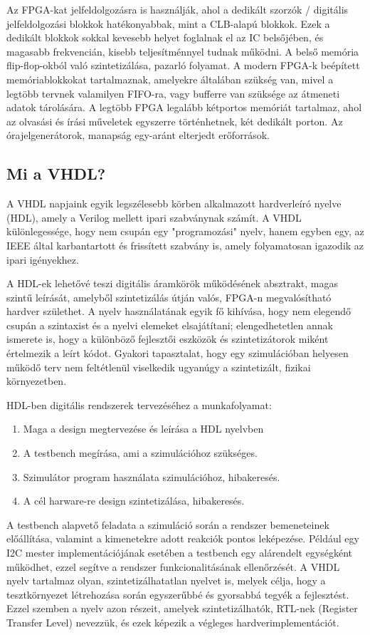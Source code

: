 \documentclass[a4paper,12pt,oneside]{book}
\begin{document}
Az FPGA-kat jelfeldolgozásra is használják, ahol a dedikált szorzók / digitális jelfeldolgozási blokkok hatékonyabbak, mint a CLB-alapú blokkok. Ezek a dedikált blokkok sokkal kevesebb helyet foglalnak el az IC belsőjében, és magasabb frekvencián, kisebb teljesítménnyel tudnak működni. A belső memória flip-flop-okból való szintetizálása, pazarló folyamat. A modern FPGA-k beépített memóriablokkokat tartalmaznak, amelyekre általában szükség van, mivel a legtöbb tervnek valamilyen FIFO-ra, vagy bufferre van szüksége az átmeneti adatok tárolására. A legtöbb FPGA legalább kétportos memóriát tartalmaz, ahol az olvasási és írási műveletek egyszerre történhetnek, két dedikált porton. Az órajelgenerátorok, manapság egy-aránt elterjedt erőforrások.
\fi
\subsection{Mi a VHDL?}

A VHDL napjaink egyik legszélesebb körben alkalmazott hardverleíró nyelve (HDL), amely a Verilog mellett ipari szabványnak számít. A VHDL különlegessége, hogy nem csupán egy "programozási" nyelv, hanem egyben egy, az IEEE által karbantartott és frissített szabvány is, amely folyamatosan igazodik az ipari igényekhez.

A HDL-ek lehetővé teszi digitális áramkörök működésének absztrakt, magas szintű leírását, amelyből szintetizálás útján valós, FPGA-n megvalósítható hardver születhet. A nyelv használatának egyik fő kihívása, hogy nem elegendő csupán a szintaxist és a nyelvi elemeket elsajátítani; elengedhetetlen annak ismerete is, hogy a különböző fejlesztői eszközök és szintetizátorok miként értelmezik a leírt kódot. Gyakori tapasztalat, hogy egy szimulációban helyesen működő terv nem feltétlenül viselkedik ugyanúgy a szintetizált, fizikai környezetben.

HDL-ben digitális rendszerek tervezéséhez a munkafolyamat:
\begin{enumerate}[label=(\alph*)]
	\item Maga a design megtervezése és leírása a HDL nyelvben  
	\item A testbench megírása, ami a szimulációhoz szükséges.
	\item Szimulátor program használata szimulációhoz, hibakeresés.
	\item A cél harware-re design szintetizálása, hibakeresés. 
\end{enumerate}
A testbench alapvető feladata a szimuláció során a rendszer bemeneteinek előállítása, valamint a kimenetekre adott reakciók pontos leképezése. Például egy I2C mester implementációjának esetében a testbench egy alárendelt egységként működhet, ezzel segítve a rendszer funkcionalitásának ellenőrzését. A VHDL nyelv tartalmaz olyan, szintetizálhatatlan nyelvet is, melyek célja, hogy a tesztkörnyezet létrehozása során egyszerűbbé és gyorsabbá tegyék a fejlesztést. Ezzel szemben a nyelv azon részeit, amelyek szintetizálhatók, RTL-nek (Register Transfer Level) nevezzük, és ezek képezik a végleges hardverimplementációt.%
\end{document}
